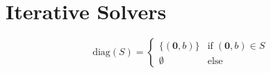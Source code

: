 \section{Iterative Solvers}
\begin{equation}
	\text{diag}(S) = \begin{cases}
		\{(\bm{0}, b) \} & \text{if} \; (\bm 0, b) \in S \\
		\emptyset & \text{else}
	\end{cases}
	\label{eq:stencil-diag}
\end{equation}